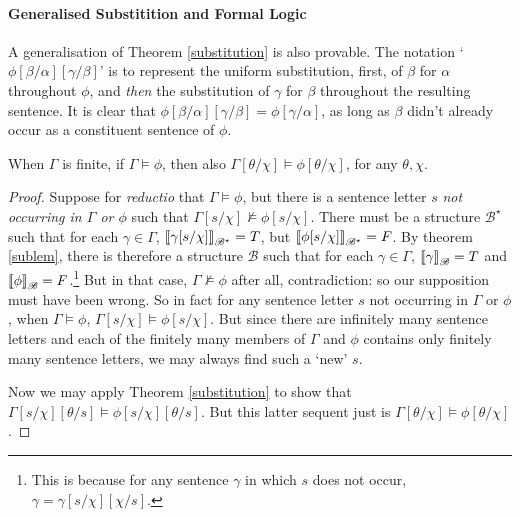\paragraph{Generalised Substitition and Formal Logic} A generalisation of Theorem \ref{substitution} is also provable. The notation ‘$\phi[\beta/\alpha][\gamma/\beta]$’ is to represent the uniform substitution, first, of $\beta$ for $\alpha$ throughout $\phi$, and \emph{then} the substitution of $\gamma$ for $\beta$ throughout the resulting sentence. It is clear that $\phi[\beta/\alpha][\gamma/\beta] = \phi[\gamma/\alpha]$, as long as $\beta$ didn't already occur as a constituent sentence of $
\phi$. \begin{theorem}\label{generalsub}
	When $\Gamma$ is finite, if $\Gamma \vDash \phi$, then also $\Gamma[\theta/\chi] \vDash \phi[\theta/\chi]$, for any $\theta, \chi$. \begin{proof}
		Suppose for \emph{reductio} that $\Gamma \vDash \phi$, but there is a sentence letter $s$ \emph{not occurring in $\Gamma$ or $\phi$} such that $\Gamma[s/\chi] \nvDash\phi[s/\chi]$. There must be a structure $\mathscr{B^{\star}}$ such that for each $\gamma \in \Gamma$, $\left\llbracket \gamma[s/\chi]\right\rrbracket_{\mathscr{B^{\star}}}=T$, but $\left\llbracket \phi[s/\chi]\right\rrbracket_{\mathscr{B^{\star}}}=F$.
		By theorem \ref{sublem}, there is therefore a structure $\mathscr{B}$ such that for each $\gamma \in \Gamma$, $\left\llbracket \gamma\right\rrbracket_{\mathscr{B}}=T$ and $\left\llbracket \phi\right\rrbracket_{\mathscr{B}}=F$.\footnote{This is because for any sentence $\gamma$ in which $s$ does not occur, $\gamma = \gamma[s/\chi][\chi/s]$.} But in that case, $\Gamma \nvDash \phi$ after all, contradiction: so our supposition must have been wrong. So in fact for any sentence letter $s$ not occurring in $\Gamma$ or $\phi$, when $\Gamma \vDash \phi$, $\Gamma[s/\chi] \vDash \phi[s/\chi]$. 
But since there are infinitely many sentence letters and each of the finitely many members of $\Gamma$ and $\phi$ contains only finitely many sentence letters, we may always find such a `new' $s$.  

	Now we may apply Theorem \ref{substitution} to show that $\Gamma[s/\chi][\theta/s] \vDash \phi[s/\chi][\theta/s]$. But this latter sequent just is $\Gamma[\theta/\chi] \vDash \phi[\theta/\chi]$.
	\end{proof}
\end{theorem}
